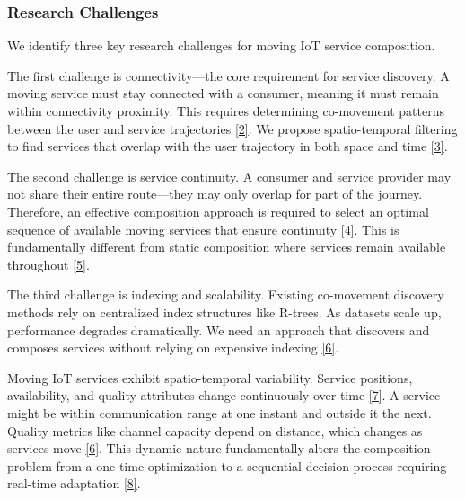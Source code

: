 \hypertarget{research-challenges}{%
	\subsubsection{Research Challenges}\label{research-challenges}}

We identify three key research challenges for moving IoT service
composition.

The first challenge is connectivity---the core requirement for service
discovery. A moving service must stay connected with a consumer, meaning
it must remain within connectivity proximity. This requires determining
co-movement patterns between the user and service trajectories \hyperlink{cite.gudmundsson2006}{\hyperlink{cite.gudmundsson2006}{[2]}}. We
propose spatio-temporal filtering to find services that overlap with the
user trajectory in both space and time \hyperlink{cite.jeung2008}{\hyperlink{cite.jeung2008}{[3]}}.

The second challenge is service continuity. A consumer and service
provider may not share their entire route---they may only overlap for
part of the journey. Therefore, an effective composition approach is
required to select an optimal sequence of available moving services that
ensure continuity \hyperlink{cite.neiat2015}{\hyperlink{cite.neiat2015}{[4]}}. This is fundamentally different from static
composition where services remain available throughout \hyperlink{cite.deng2016}{\hyperlink{cite.deng2016}{[5]}}.

The third challenge is indexing and scalability. Existing co-movement
discovery methods rely on centralized index structures like R-trees. As
datasets scale up, performance degrades dramatically. We need an
approach that discovers and composes services without relying on
expensive indexing \hyperlink{cite.zhang2015}{\hyperlink{cite.zhang2015}{[6]}}.

Moving IoT services exhibit spatio-temporal variability. Service
positions, availability, and quality attributes change continuously over
time \hyperlink{cite.deng2017}{\hyperlink{cite.deng2017}{[7]}}. A service might be within communication range at one instant and
outside it the next. Quality metrics like channel capacity depend on
distance, which changes as services move \hyperlink{cite.zhang2015}{\hyperlink{cite.zhang2015}{[6]}}. This dynamic nature
fundamentally alters the composition problem from a one-time
optimization to a sequential decision process requiring real-time
adaptation \hyperlink{cite.gai2018}{\hyperlink{cite.gai2018}{[8]}}.


